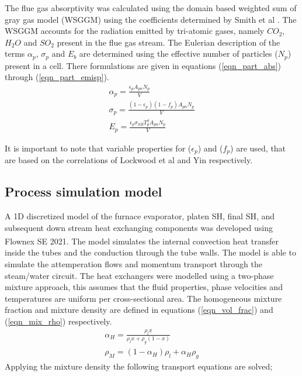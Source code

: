 \documentclass[review]{elsarticle}
\begin{document}
The flue gas absorptivity was calculated using the domain based weighted sum of gray gas model (WSGGM) using the coefficients determined by Smith et al \cite{Smith1982}. The WSGGM accounts for the radiation emitted by tri-atomic gases, namely $CO_2$, $H_2O$ and $SO_2$ present in the flue gas stream. The Eulerian description of the terms $\alpha_p$, $\sigma_p$ and $E_b$ are determined using the effective number of particles ($N_p$) present in a cell. There formulations are given in equations (\ref{eqn_part_abs}) through (\ref{eqn_part_emisp}).
\begin{gather}
\alpha_p = \frac{\epsilon_p A_{pn}N_p}{V} \label{eqn_part_abs}\\
\sigma_p = \frac{(1-\epsilon_p)(1-f_p) A_{pn}N_p}{V} \label{eqn_part_scat} \\
E_p = \frac{\epsilon_p \sigma_{SB} T_p^4 A_{pn}N_p}{V}\label{eqn_part_emisp}
\end{gather}

It is important to note that variable properties for ($\epsilon_p$) and ($f_p$) are used, that are based on the correlations of Lockwood et al \cite{Lockwood1986} and Yin \citep{Yin2015} respectively.

\subsection{Process simulation model}
A 1D discretized model of the furnace evaporator, platen SH, final SH, and subsequent down stream heat exchanging components was developed using Flownex SE\textsuperscript{\textregistered} 2021. The model simulates the internal convection heat transfer inside the tubes and the conduction through the tube walls. The model is able to simulate the attemperation flows and momentum transport through the steam/water circuit. The heat exchangers were modelled using a two-phase mixture approach, this assumes that the fluid properties, phase velocities and temperatures are uniform per cross-sectional area. The homogeneous mixture fraction and mixture density are defined in equations (\ref{eqn_vol_frac}) and (\ref{eqn_mix_rho}) respectively.
\begin{gather}
\alpha_H = \frac{\rho_l x}{\rho_lx + \rho_g(1-x)} \label{eqn_vol_frac}\\  
\rho_M = (1-\alpha_H)\rho_l + \alpha_H\rho_g \label{eqn_mix_rho}
\end{gather}
Applying the mixture density the following transport equations are solved;
\end{document}
